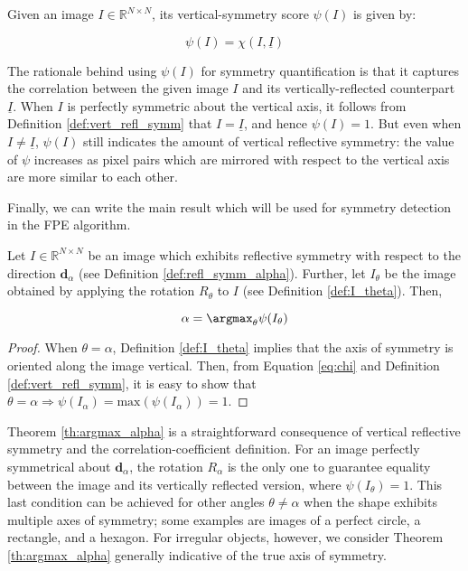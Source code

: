 \begin{definition}
    \label{def:psi_I}
    Given an image $I\in \mathbb{R}^{N\times N}$, its vertical-symmetry score $\psi(I)$ is given by:

    \begin{equation}
        \psi(I) = \chi(I,\underline{I})
    \end{equation}
\end{definition}

The rationale behind using $\psi(I)$ for symmetry quantification is that it captures the correlation between the given image $I$ and its vertically-reflected counterpart $\underline{I}$. When $I$ is perfectly symmetric about the vertical axis, it follows from Definition \ref{def:vert_refl_symm} that $I = \underline{I}$, and hence $\psi(I)=1$. But even when $I \neq \underline{I}$, $\psi(I)$ still indicates the amount of vertical reflective symmetry: the value of $\psi$ increases as pixel pairs which are mirrored with respect to the vertical axis are more similar to each other.

Finally, we can write the main result which will be used for symmetry detection in the FPE algorithm.

\begin{theorem}
        \label{th:argmax_alpha}
        Let $I\in\mathbb{R}^{N\times N}$ be an image which exhibits reflective symmetry with respect to the direction $\mathbf{d}_\alpha$ (see Definition \ref{def:refl_symm_alpha}). Further, let $I_\theta$ be the image obtained by applying the rotation $R_\theta$ to $I$ (see Definition \ref{def:I_theta}). Then,

            \begin{equation}
        \alpha = \argmax_{\theta} \psi(I_\theta)
    \end{equation}
    
\end{theorem}

\begin{proof}
    When $\theta = \alpha$, Definition \ref{def:I_theta} implies that the axis of symmetry is oriented along the image vertical. Then, from Equation \ref{eq:chi} and Definition \ref{def:vert_refl_symm}, it is easy to show that $\theta = \alpha \Rightarrow \psi(I_\alpha) = \mathrm{max}(\psi(I_\alpha)) = 1$.
\end{proof}

Theorem \ref{th:argmax_alpha} is a straightforward consequence of vertical reflective symmetry and the correlation-coefficient definition. For an image perfectly symmetrical about $\mathbf{d}_\alpha$, the rotation $R_\alpha$ is the only one to guarantee equality between the image and its vertically reflected version, where $\psi(I_\theta)=1$. This last condition can be achieved for other angles $\theta \neq \alpha$ when the shape exhibits multiple axes of symmetry; some examples are images of a perfect circle, a rectangle, and a hexagon. For irregular objects, however, we consider Theorem \ref{th:argmax_alpha} generally indicative of the true axis of symmetry.

